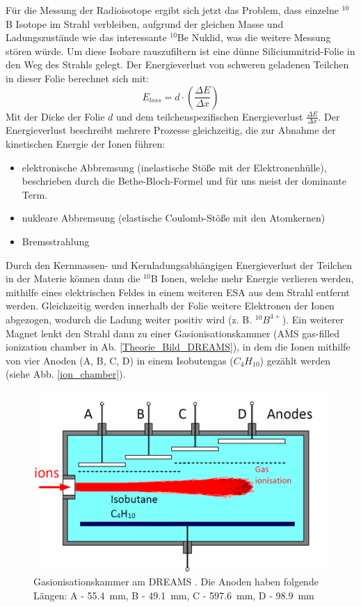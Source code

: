 Für die Messung der Radioisotope ergibt sich jetzt das Problem, dass einzelne $^{10}$B Isotope im Strahl verbleiben, aufgrund der gleichen Masse und Ladungszustände wie das interessante $^{10}$Be Nuklid, was die weitere Messung stören würde.
Um diese Isobare rauszufiltern ist eine dünne Siliciumnitrid-Folie in den Weg des Strahls gelegt.
Der Energieverlust von schweren geladenen Teilchen in dieser Folie berechnet sich mit:
\begin{equation}
E_{loss} = d \cdot \left( \frac{\Delta E}{\Delta x} \right)
\end{equation}
Mit der Dicke der Folie $d$ und dem teilchenspezifischen Energieverlust $\frac{\Delta E}{\Delta x}$.
Der Energieverlust beschreibt mehrere Prozesse gleichzeitig, die zur Abnahme der kinetischen Energie der Ionen führen:
\begin{itemize}
    \item elektronische Abbremsung (inelastische Stöße mit der Elektronenhülle), beschrieben durch die Bethe-Bloch-Formel und für uns meist der dominante Term.
    \item nukleare Abbremsung (elastische Coulomb-Stöße mit den Atomkernen)
    \item Bremsstrahlung
\end{itemize}
Durch den Kernmassen- und Kernladungsabhängigen Energieverlust der Teilchen in der Materie können dann die $^{10}$B Ionen, welche mehr Energie verlieren werden, mithilfe eines elektrischen Feldes in einem weiteren ESA aus dem Strahl entfernt werden.
Gleichzeitig werden innerhalb der Folie weitere Elektronen der Ionen abgezogen, wodurch die Ladung weiter positiv wird (z. B. $^{10}B^{4+}$).
Ein weiterer Magnet lenkt den Strahl dann zu einer Gasionisationskammer (AMS gas-filled ionization chamber in Ab. \ref{Theorie_Bild_DREAMS}), in dem die Ionen mithilfe von vier Anoden (A, B, C, D) in einem Isobutengas ($C_{4}H_{10}$) gezählt werden (siehe Abb. \ref{ion_chamber}).
\begin{figure}[ht]
  \includegraphics[width=0.95\linewidth]{../Bilder/ion_chamber.png}
  \caption{Gasionisationskammer am DREAMS \cite{Bild_Ionisationskammer}. Die Anoden haben folgende Längen: A - \SI{55.4}{\milli\metre}, B - \SI{49.1}{\milli\metre}, C - \SI{597.6}{\milli\metre}, D - \SI{98.9}{\milli\metre}}
  \label{Theorie_ion_chamber}
\end{figure}
\clearpage
